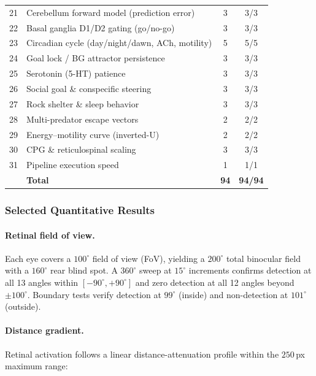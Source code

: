 \documentclass[11pt,a4paper]{article}
\begin{document}
\begin{table}[H]
\begin{tabular}{clcc}
21 & Cerebellum forward model (prediction error)        & 3 & 3/3 \\
22 & Basal ganglia D1/D2 gating (go/no-go)             & 3 & 3/3 \\
23 & Circadian cycle (day/night/dawn, ACh, motility)    & 5 & 5/5 \\
24 & Goal lock / BG attractor persistence               & 3 & 3/3 \\
25 & Serotonin (5-HT) patience                          & 3 & 3/3 \\
26 & Social goal \& conspecific steering                 & 3 & 3/3 \\
27 & Rock shelter \& sleep behavior                      & 3 & 3/3 \\
28 & Multi-predator escape vectors                       & 2 & 2/2 \\
29 & Energy--motility curve (inverted-U)                 & 2 & 2/2 \\
30 & CPG \& reticulospinal scaling                       & 3 & 3/3 \\
31 & Pipeline execution speed                            & 1 & 1/1 \\
\midrule
   & \textbf{Total}                                     & \textbf{94} & \textbf{94/94} \\
\bottomrule
\end{tabular}
\end{table}

\subsubsection{Selected Quantitative Results}

\paragraph{Retinal field of view.}
Each eye covers a $100^\circ$ field of view (FoV), yielding a $200^\circ$
total binocular field with a $160^\circ$ rear blind spot. A $360^\circ$ sweep
at $15^\circ$ increments confirms detection at all 13 angles within
$[-90^\circ, +90^\circ]$ and zero detection at all 12 angles beyond $\pm100^\circ$.
Boundary tests verify detection at $99^\circ$ (inside) and non-detection at $101^\circ$ (outside).

\paragraph{Distance gradient.}
Retinal activation follows a linear distance-attenuation profile within
the $250$\,px maximum range:
\end{document}
